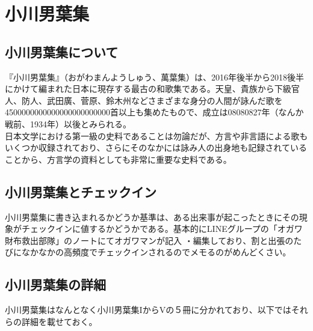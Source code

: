 \documentclass[12pt]{jsarticle}
\begin{document}
\section{小川男葉集}
\subsection{小川男葉集について}
『小川男葉集』（おがわまんようしゅう、萬葉集）は、2016年後半から2018後半にかけて編まれた日本に現存する最古の和歌集である。天皇、貴族から下級官人、防人、武田廣、菅原、鈴木州などさまざまな身分の人間が詠んだ歌を4500000000000000000000000首以上も集めたもので、成立は08080827年（なんか戦前、1934年）以後とみられる。\\
日本文学における第一級の史料であることは勿論だが、方言や非言語による歌もいくつか収録されており、さらにそのなかには詠み人の出身地も記録されていることから、方言学の資料としても非常に重要な史料である。\\

\subsection{小川男葉集とチェックイン}
小川男葉集に書き込まれるかどうか基準は、ある出来事が起こったときにその現象がチェックインに値するかどうかである。基本的にLINEグループの「オガワ財布救出部隊」のノートにてオガワマンが記入
・編集しており、割と出張のたびになかなかの高頻度でチェックインされるのでメモるのがめんどくさい。

\subsection{小川男葉集の詳細}
小川男葉集はなんとなく小川男葉集IからVの５冊に分かれており、以下ではそれらの詳細を載せておく。

\newpage
\end{document}
